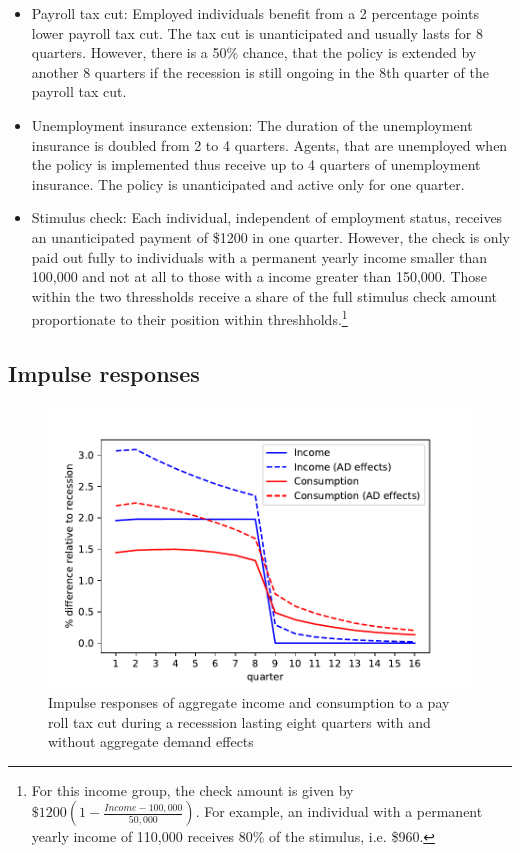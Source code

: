 \documentclass[11pt]{article}
\begin{document}
	\begin{itemize}
		\item Payroll tax cut: Employed individuals benefit from a 2 percentage points lower payroll tax cut. The tax cut is unanticipated and usually lasts for 8 quarters. However, there is a 50\% chance, that the policy is extended by another 8 quarters if the recession is still ongoing in the 8th quarter of the payroll tax cut. 
		\item Unemployment insurance extension: The duration of the unemployment insurance is doubled from 2 to 4 quarters. Agents, that are unemployed when the policy is implemented thus receive up to 4 quarters of unemployment insurance. The policy is unanticipated and active only for one quarter.
		\item Stimulus check: Each individual, independent of employment status, receives an unanticipated payment of \$1200 in one quarter. However, the check is only paid out fully to individuals with a permanent yearly income smaller than 100,000 and not at all to those with a income greater than 150,000. Those within the two thressholds receive a share of the full stimulus check amount proportionate to their position within threshholds.\footnote{For this income group, the check amount is given by $\$1200 (1-\frac{Income-100,000}{50,000})$. For example, an individual with a permanent yearly income of 110,000 receives 80\% of the stimulus, i.e. \$960.}
	\end{itemize}
	
	\subsection{Impulse responses}
	
	
	\begin{figure}
		\centering
		\includegraphics[width=0.8\linewidth]{../Code/HA-Models/FromPandemicCode/Figures/recession_taxcut_relrecession}
		\caption{Impulse responses of aggregate income and consumption to a pay roll tax cut during a recesssion lasting eight quarters with and without aggregate demand effects}
		\label{fig:recessiontaxcutrelrecession}
	\end{figure}
	
\end{document}
